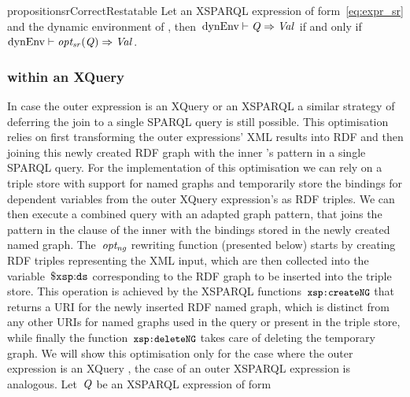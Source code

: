 %
\begin{restatable}{proposition}{srCorrectRestatable}
  \label{prop:sr-correct}
  Let  an XSPARQL expression of form~\eqref{eq:expr_sr} and \dyn the dynamic environment of ,
  then~${\textrm{dynEnv}} \vdash \mathit{{Q}_{}} \Rightarrow \mathit{{Val}_{}}$ if and only if~${\textrm{dynEnv}} \vdash \mathit{opt_{sr}}\!\left(\mathit{{Q}_{}}\right)
    \Rightarrow \mathit{{Val}_{}}$.
\end{restatable}
%




\subsubsection{\SparqlForClause within an XQuery \FOR}
\label{sec:named-graphs}
%
In case the outer expression is an XQuery \FOR or an XSPARQL \SQLForClause a similar strategy of deferring the join to a
single SPARQL query is still possible.  
%
This optimisation relies on first transforming the outer expressions' \ac{XML} results into \ac{RDF} and then joining this newly created
\ac{RDF} graph with the inner \SparqlForClause's \WHERE pattern in a single SPARQL query.  
%
For the implementation of this optimisation we can rely on a triple store with support for named graphs and temporarily
store the bindings for dependent variables from the outer XQuery \FOR expression's as \ac{RDF} triples.
%
We can then execute a combined query with an adapted graph pattern, that joins the pattern in the \WHERE clause of the
inner \SparqlForClause with the bindings stored in the newly created named graph.
%
The~$\mathit{opt_{ng}}$ rewriting function (presented below) starts by creating \ac{RDF} triples representing the
\ac{XML} input, which are then collected into the variable~$\$\mathtt{xsp{:}ds}$ corresponding to the \ac{RDF} graph to be
inserted into the triple store.  This operation is achieved by the XSPARQL functions~$\texttt{{\small \texttt{{\small xsp{:}}}createNG}}$ that returns
a URI for the newly inserted \ac{RDF} named graph, which is distinct from any other URIs for named graphs used in the
query or present in the triple store, while finally the function~$\texttt{{\small \texttt{{\small xsp{:}}}deleteNG}}$ takes care of deleting the
temporary graph.
%
We will show this optimisation only for the case where the outer expression is an XQuery \FOR, the case of an outer
XSPARQL \SQLForClause expression is analogous. 
%
Let~$\mathit{{Q}_{}}$ be an XSPARQL expression of form

